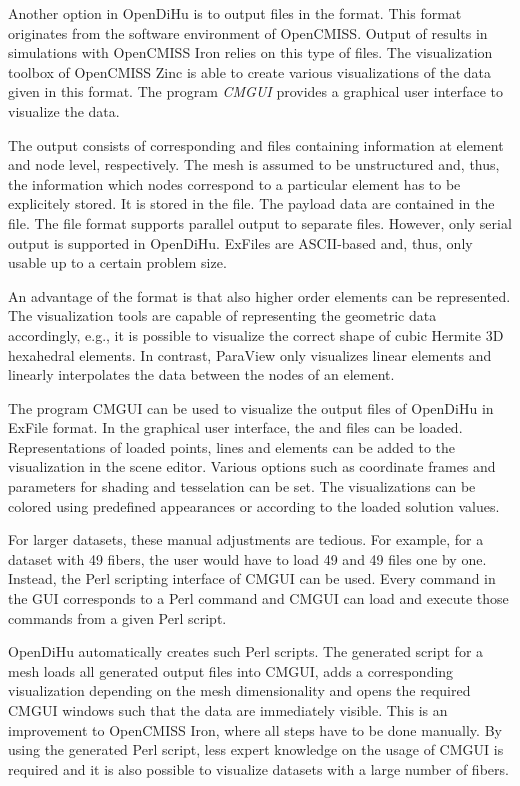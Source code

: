Another option in OpenDiHu is to output files in the  format. This format originates from the software environment of OpenCMISS. Output of results in simulations with OpenCMISS Iron relies on this type of files. The visualization toolbox of OpenCMISS Zinc is able to create various visualizations of the data given in this format. The program \emph{CMGUI} provides a graphical user interface to visualize the data.

The output consists of corresponding  and  files containing information at element and node level, respectively. The mesh is assumed to be unstructured and, thus, the information which nodes correspond to a particular element has to be explicitely stored. It is stored in the  file. The payload data are contained in the  file. The file format supports parallel output to separate files. However, only serial output is supported in OpenDiHu.
ExFiles are ASCII-based and, thus, only usable up to a certain problem size.

An advantage of the  format is that also higher order elements can be represented. The visualization tools are capable of representing the geometric data accordingly, e.g., it is possible to visualize the correct shape of cubic Hermite 3D hexahedral elements. In contrast, ParaView only visualizes linear elements and linearly interpolates the data between the nodes of an element.

The program CMGUI can be used to visualize the output files of OpenDiHu in ExFile format.
In the graphical user interface, the  and  files can be loaded. Representations of loaded points, lines and elements can be added to the visualization in the scene editor. Various options such as coordinate frames and parameters for shading and tesselation can be set. The visualizations can be colored using predefined appearances or according to the loaded solution values.

For larger datasets, these manual adjustments are tedious. For example, for a dataset with 49 fibers, the user would have to load 49  and 49  files one by one. Instead, the Perl scripting interface of CMGUI can be used. Every command in the GUI corresponds to a Perl command and CMGUI can load and execute those commands from a given Perl script.

OpenDiHu automatically creates such Perl scripts. The generated script for a mesh loads all generated output files into CMGUI, adds a  corresponding visualization depending on the mesh dimensionality and opens the required CMGUI windows such that the data are immediately visible. This is an improvement to OpenCMISS Iron, where all steps have to be done manually. By using the generated Perl script, less expert knowledge on the usage of CMGUI is required and it is also possible to visualize datasets with a large number of fibers.

